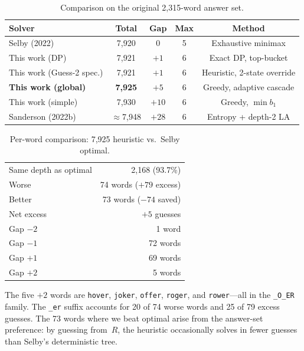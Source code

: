 \documentclass[11pt]{article}
\begin{document}
	\begin{table}[h]
		\centering
		\caption{Comparison on the original 2,315-word answer set.}
		\label{tab:comparison}
		\begin{tabular}{@{}lcccc@{}}
			\toprule
			Solver & Total & Gap & Max & Method \\
			\midrule
			Selby (2022) & 7,920 & 0 & 5 & Exhaustive minimax \\
			This work (DP) & 7,921 & $+1$ & 6 & Exact DP, top-bucket \\
			This work (Guess-2 spec.) & 7,921 & $+1$ & 6 & Heuristic, 2-state override \\
			\textbf{This work (global)} & \textbf{7,925} & $+5$ & 6 & Greedy, adaptive cascade \\
			This work (simple) & 7,930 & $+10$ & 6 & Greedy, $\min b_1$ \\
			Sanderson (2022b) & $\approx$7,948 & $+28$ & 6 & Entropy + depth-2 LA \\
			\bottomrule
		\end{tabular}
	\end{table}
	
	\begin{table}[h]
		\centering
		\caption{Per-word comparison: 7,925 heuristic vs.\ Selby optimal.}
		\label{tab:perword}
		\begin{tabular}{@{}lr@{}}
			\toprule
			Same depth as optimal & 2,168 (93.7\%) \\
			Worse & 74 words ($+79$ excess) \\
			Better & 73 words ($-74$ saved) \\
			Net excess & $+5$ guesses \\
			\midrule
			Gap $-2$ & 1 word \\
			Gap $-1$ & 72 words \\
			Gap $+1$ & 69 words \\
			Gap $+2$ & 5 words \\
			\bottomrule
		\end{tabular}
	\end{table}
	
	The five $+2$ words are \texttt{hover}, \texttt{joker}, \texttt{offer}, \texttt{roger}, and \texttt{rower}---all in the \texttt{\_O\_ER} family.  The \texttt{\_er} suffix accounts for 20 of 74 worse words and 25 of 79 excess guesses.  The 73 words where we beat optimal arise from the answer-set preference: by guessing from~$R$, the heuristic occasionally solves in fewer guesses than Selby's deterministic tree.
	
\end{document}
